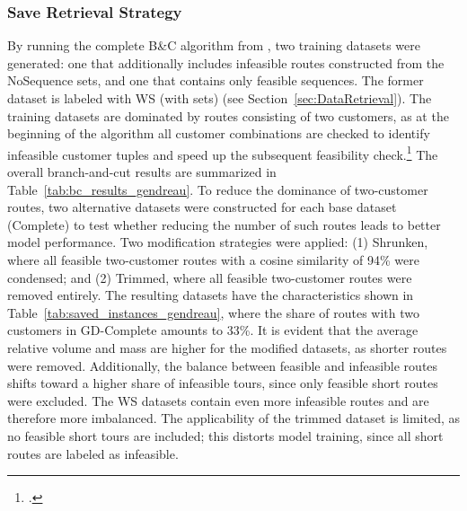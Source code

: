 \subsubsection{Save Retrieval Strategy}
By running the complete B\&C algorithm from \cite{tamke_branch-and-cut_2024}, two training datasets were generated: one that additionally
includes infeasible routes constructed from the NoSequence sets, and one that contains only feasible sequences. The former dataset is
labeled with WS (with sets) (see Section~\ref{sec:DataRetrieval}).
The training datasets are dominated by routes consisting of two customers, as at the beginning of the algorithm all customer combinations
are checked to identify infeasible customer tuples and speed up the subsequent feasibility check.\footcite[cf.][]{tamke_branch-and-cut_2024}
The overall branch-and-cut results are summarized in Table~\ref{tab:bc_results_gendreau}.
To reduce the dominance of two-customer routes, two alternative datasets were constructed for each base dataset (Complete) to test
whether reducing the number of such routes leads to better model performance. Two modification strategies were applied: (1) Shrunken,
where all feasible two-customer routes with a cosine similarity of 94\% were condensed; and (2) Trimmed, where all feasible two-customer
routes were removed entirely.
The resulting datasets have the characteristics shown in Table~\ref{tab:saved_instances_gendreau},
where the share of routes with two customers in GD-Complete amounts to 33\%. It is evident that the average
relative volume and mass are higher for the modified datasets, as shorter routes were removed. Additionally, the balance between feasible
and infeasible routes shifts toward a higher share of infeasible tours, since only feasible short routes were excluded. The WS datasets
contain even more infeasible routes and are therefore more imbalanced. The applicability of the trimmed dataset is limited, as no feasible
short tours are included; this distorts model training, since all short routes are labeled as infeasible.

